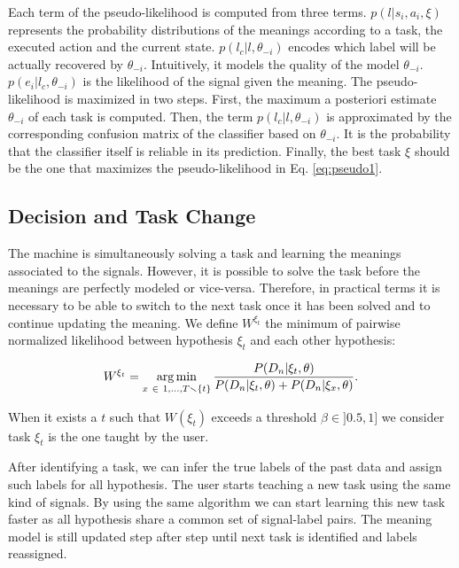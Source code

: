 Each term of the pseudo-likelihood is computed from three terms. $p(l|s_i,a_i,\xi)$ represents the probability distributions of the meanings according to a task, the executed action and the current state.   $p(l_c | l, \theta_{-i})$ encodes which label will be actually recovered by $\theta_{-i}$. Intuitively, it models the quality of the model $\theta_{-i}$. $p(e_i | l_c,\theta_{-i})$ is the likelihood of the signal given the meaning. 
%
The pseudo-likelihood is maximized in two steps. First, the maximum a posteriori estimate $\theta_{-i}$ of each task is computed. Then, the term $p(l_c | l, \theta_{-i})$ is approximated by the corresponding confusion matrix of the classifier based on $\theta_{-i}$. It is the probability that the classifier itself is reliable in its prediction. Finally, the best task $\xi$ should be the one that maximizes the pseudo-likelihood in Eq. \ref{eq:pseudo1}.

\subsection{Decision and Task Change}

The machine is simultaneously solving a task and learning the meanings associated to the signals. However, it is possible to solve the task before the meanings are perfectly modeled or vice-versa. Therefore, in practical terms it is necessary to be able to switch to the next task once it has been solved and to continue updating the meaning. 
%
We define $W^{\xi_t}$ the minimum of pairwise normalized likelihood between hypothesis $\xi_t$ and each other hypothesis: 

\begin{eqnarray}
W^{\xi_t} = \argmin_{x~\in~{1, \ldots, T} \smallsetminus \{t\}} \frac{P(D_n | \xi_t, \theta)}{P(D_n | \xi_t, \theta) + P(D_n | \xi_x, \theta)}.
\label{eq:weight}
\end{eqnarray}

When it exists a $t$ such that $W(\xi_t)$ exceeds a threshold $\beta \in ]0.5,1]$ we consider task $\xi_t$ is the one taught by the user.

After identifying a task, we can infer the true labels of the past data and assign such labels for all hypothesis. The user starts teaching a new task using the same kind of signals. By using the same algorithm we can start learning this new task faster as all hypothesis share a common set of signal-label pairs. The meaning model is still updated step after step until next task is identified and labels reassigned.

